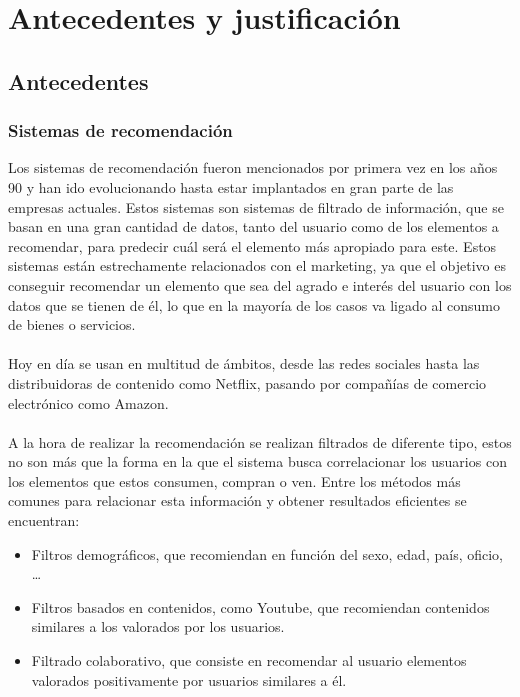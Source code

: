 \chapter{Antecedentes y justificación}
\thispagestyle{fancy}

\section{Antecedentes}


\subsection{Sistemas de recomendación}
Los sistemas de recomendación fueron mencionados por primera vez en los años 90 y han ido evolucionando hasta estar implantados en gran parte de las empresas actuales. Estos sistemas son sistemas de filtrado de información, que se basan en una gran cantidad de datos, tanto del usuario como de los elementos a recomendar, para predecir cuál será el elemento más apropiado para este. Estos sistemas están estrechamente relacionados con el marketing, ya que el objetivo es conseguir recomendar un elemento que sea del agrado e interés del usuario con los datos que se tienen de él, lo que en la mayoría de los casos va ligado al consumo de bienes o servicios. 
\\ \\
Hoy en día se usan en multitud de ámbitos, desde las redes sociales hasta las distribuidoras de contenido como Netflix, pasando por compañías de comercio electrónico como Amazon. 
\\ \\
A la hora de realizar la recomendación se realizan filtrados de diferente tipo, estos no son más que la forma en la que el sistema busca correlacionar los usuarios con los elementos que estos consumen, compran o ven. Entre los métodos más comunes para relacionar esta información y obtener resultados eficientes se encuentran:
\begin{itemize}
    \item Filtros demográficos, que recomiendan en función del sexo, edad, país, oficio, … 
    \item Filtros basados en contenidos, como Youtube, que recomiendan contenidos similares a los valorados por los usuarios. 
    \item Filtrado colaborativo, que consiste en recomendar al usuario elementos valorados positivamente por usuarios similares a él. 
\end{itemize}

